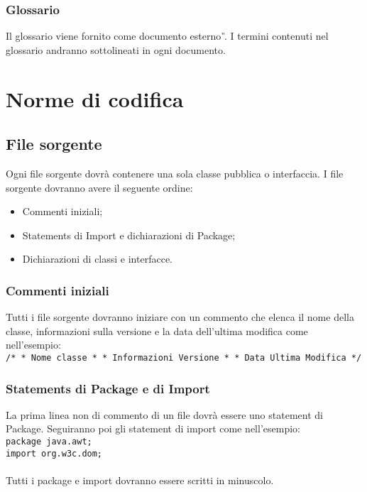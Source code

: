 \subsection{Glossario}
Il glossario viene fornito come documento esterno \textit{\G}. I termini contenuti nel glossario andranno sottolineati in ogni documento.

\chapter{Norme di codifica}
\section{File sorgente}
Ogni file sorgente dovr\`a contenere una sola classe pubblica o interfaccia. I file sorgente dovranno avere il seguente ordine:
\begin{itemize}
\item Commenti iniziali;
\item Statements di Import e dichiarazioni di Package;
\item Dichiarazioni di classi e interfacce.
\end{itemize}
\subsection{Commenti iniziali}
Tutti i file sorgente dovranno iniziare con un commento che elenca il nome della classe, informazioni sulla versione e la data dell'ultima modifica come nell'esempio: \\
 \newline
\texttt{/* \newline
* Nome classe \newline
* \newline
* Informazioni Versione \newline
* \newline
* Data Ultima Modifica \newline
*/ \\}
 \newline
\subsection{Statements di Package e di Import}
La prima linea non di commento di un file dovr\`a essere uno statement di Package. Seguiranno poi gli statement di import come nell'esempio: \\
 \newline
\texttt{package java.awt; \\ 
import org.w3c.dom; \\} \\
Tutti i package e import dovranno essere scritti in minuscolo.
